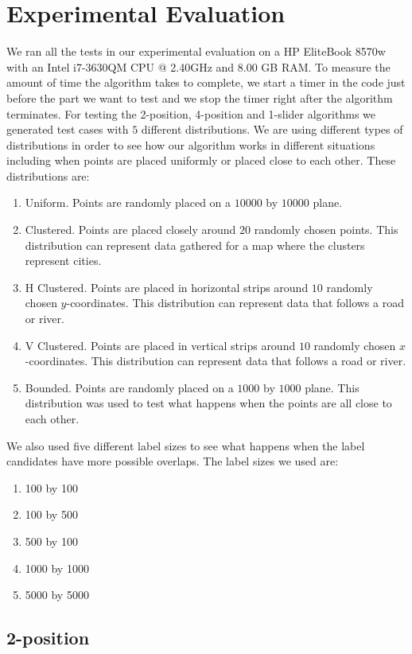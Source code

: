 \documentclass[crop=false,a4paper,oneside,11pt]{standalone}
\begin{document}
\section{Experimental Evaluation}

We ran all the tests in our experimental evaluation on a HP EliteBook 8570w with an Intel i7-3630QM CPU @ 2.40GHz and 8.00 GB RAM. To measure the amount of time the algorithm takes to complete, we start a timer in the code just before the part we want to test and we stop the timer right after the algorithm terminates. For testing the 2-position, 4-position and 1-slider algorithms we generated test cases with $5$ different distributions. We are using different types of distributions in order to see how our algorithm works in different situations including when points are placed uniformly or placed close to each other. These distributions are:
\begin{enumerate}
    \item Uniform. Points are randomly placed on a $10000$ by $10000$ plane.
    \item Clustered. Points are placed closely around $20$ randomly chosen points. This distribution can represent data gathered for a map where the clusters represent cities.
    \item H Clustered. Points are placed in horizontal strips around $10$ randomly chosen $y$-coordinates. This distribution can represent data that follows a road or river.
    \item V Clustered. Points are placed in vertical strips around $10$ randomly chosen $x$-coordinates. This distribution can represent data that follows a road or river.
    \item Bounded. Points are randomly placed on a $1000$ by $1000$ plane. This distribution was used to test what happens when the points are all close to each other.
\end{enumerate}
We also used five different label sizes to see what happens when the label candidates have more possible overlaps. The label sizes we used are:
\begin{enumerate}
    \item 100 by 100
    \item 100 by 500
    \item 500 by 100
    \item 1000 by 1000
    \item 5000 by 5000
\end{enumerate}

\subsection{2-position}
\end{document}
